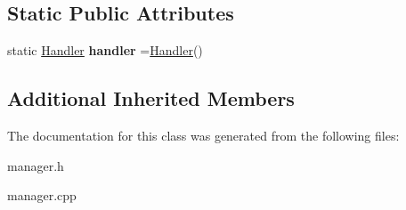 \subsection*{Static Public Attributes}
\begin{DoxyCompactItemize}
\item 
\mbox{\label{class_notes_manager2_acf06af60a32413e279f6879592b4f9da}} 
static \hyperlink{struct_notes_manager2_1_1_handler}{Handler} {\bfseries handler} =\hyperlink{struct_notes_manager2_1_1_handler}{Handler}()
\end{DoxyCompactItemize}
\subsection*{Additional Inherited Members}


The documentation for this class was generated from the following files\+:\begin{DoxyCompactItemize}
\item 
manager.\+h\item 
manager.\+cpp\end{DoxyCompactItemize}
